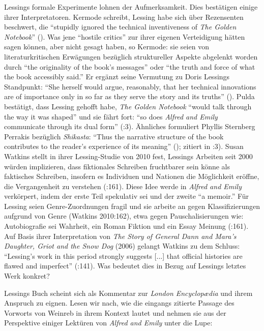 \documentclass[fontsize=12pt]{scrartcl}
\begin{document}
Lessings formale Experimente lohnen der Aufmerksamkeit. Dies best\"atigen einige ihrer Interpretatoren\textsuperscript{\tiny *}. Kermode schreibt, Lessing habe sich \"uber Rezensenten\textsuperscript{\tiny *} be\-schwert, die "`stupidly ignored the technical inventiveness of \textit{The Golden Notebook}"' (\cite{Kermode2008}). Was jene "`hostile critics"' zur ihrer eigenen Verteidigung h\"atten sagen k\"onnen, aber nicht gesagt haben, so Kermode: sie seien von li\-te\-ra\-tur\-kritischen Er\-w\"a\-gungen bez\"uglich struktureller Aspekte abgelenkt worden durch "`the origina\-li\-ty of the book's messages"' oder "`the truth and force of what the book accessibly said."' Er erg\"anzt seine Vermutung zu Doris Lessings Standpunkt: "`She herself would argue, reasonably, that her technical innovations are of importance only in so far as they serve the story and its truths"' (\cite{Kermode2008}). Pulda best\"atigt, dass Lessing gehofft habe, \textit{The Golden Notebook} "`would talk through the way it was shaped"' und sie f\"ahrt fort: "`so does \textit{Alfred and Emily} communicate through its dual form"' (\cite{Pulda2010}:3). \"Ahnliches formuliert Phyllis Sternberg Perrakis bez\"uglich \textit{Shikasta}: "`Thus the narrative structure of the book contributes to the reader's experience of its meaning"' (\cite{Perrakis2007}); zitiert in \cite{Pulda2010}:3). Susan Watkins stellt in ihrer Lessing-Studie von 2010 fest, Lessings Arbei\-ten seit 2000 w\"urden implizieren, dass fiktionales Schrei\-ben fruchtbarer sein k\"onne als faktisches Schrei\-ben, insofern es Individuen und Nationen die M\"oglichkeit er\"offne, die Vergangenheit zu verstehen (\cite{Watkins2008}:161). Diese Idee werde in \textit{Alfred and Emily} verk\"orpert, indem der erste Teil spekulativ sei und der zweite "`a memoir."' F\"ur Lessing seien Genre-Zuordnungen fragil und sie arbeite an gegen Klassifizierungen aufgrund von Genre (Watkins 2010:162), etwa gegen Pauschalisierungen wie: Auto\-bio\-gra\-fie sei Wahrheit, ein Roman Fiktion und ein Essay Meinung (\cite{Watkins2008}:161). Auf Basis ihrer Interpretation von \textit{The Story of General Dann and Mara's Daughter, Griot and the Snow Dog} (2006) gelangt Watkins zu dem Schluss: "`Lessing's work in this period strongly suggests [...] that official histories are flawed and imperfect"' (\cite{Watkins2008}:141). Was bedeutet dies in Bezug auf Lessings letztes Werk konkret?

Lessings Buch scheint sich als Kommentar zur \textit{London Encyclop{\ae}dia} und ihrem Anspruch zu eignen. Lesen wir nach, wie die eingangs zitierte Passage des Vorworts von Weinreb in ihrem Kontext lautet und nehmen sie aus der Perspektive einiger Lekt\"uren von \textit{Alfred and Emily} unter die Lupe: 
\end{document}
